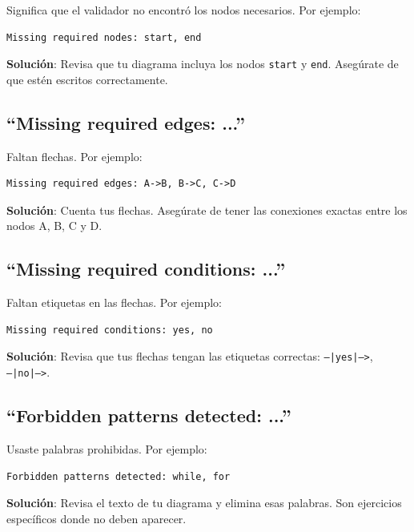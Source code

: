 \documentclass[12pt]{article}
\begin{document}
Significa que el validador no encontró los nodos necesarios. Por ejemplo:

\begin{lstlisting}[style=mermaidstyle]
Missing required nodes: start, end
\end{lstlisting}

\textbf{Solución}: Revisa que tu diagrama incluya los nodos \texttt{start} y \texttt{end}. Asegúrate de que estén escritos correctamente.

\subsection{``Missing required edges: ...''}

Faltan flechas. Por ejemplo:

\begin{lstlisting}[style=mermaidstyle]
Missing required edges: A->B, B->C, C->D
\end{lstlisting}

\textbf{Solución}: Cuenta tus flechas. Asegúrate de tener las conexiones exactas entre los nodos A, B, C y D.

\subsection{``Missing required conditions: ...''}

Faltan etiquetas en las flechas. Por ejemplo:

\begin{lstlisting}[style=mermaidstyle]
Missing required conditions: yes, no
\end{lstlisting}

\textbf{Solución}: Revisa que tus flechas tengan las etiquetas correctas: \texttt{--|yes|-->}, \texttt{--|no|-->}.

\subsection{``Forbidden patterns detected: ...''}

Usaste palabras prohibidas. Por ejemplo:

\begin{lstlisting}[style=mermaidstyle]
Forbidden patterns detected: while, for
\end{lstlisting}

\textbf{Solución}: Revisa el texto de tu diagrama y elimina esas palabras. Son ejercicios específicos donde no deben aparecer.
\end{document}
